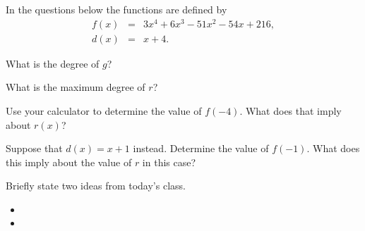 \begin{problem}
  In the questions below the functions are defined by
  \begin{eqnarray*}
    f(x) & = & 3x^4+6x^3-51x^2-54x+216, \\
    d(x) & = & x+4.
  \end{eqnarray*}
  \begin{subproblem}
  \item What is the degree of $g$?

    \vfill

  \item What is the maximum degree of $r$?

    \vfill

  \item Use your calculator to determine the value of $f(-4)$. What
    does that imply about $r(x)$?

    \vfill

  \item Suppose that $d(x)=x+1$ instead. Determine the value of
    $f(-1)$. What does this imply about the value of $r$ in this case?

    \vfill
    
  \end{subproblem}

  \clearpage

\item 
  \begin{subproblem}
  \item 
    \vfill
  \item 
    \vfill
  \end{subproblem}

\end{problem}

\postClass

\begin{problem}
\item Briefly state two ideas from today's class.
  \begin{itemize}
  \item 
  \item 
  \end{itemize}
\item 
  \begin{subproblem}
    \item
  \end{subproblem}
\end{problem}



